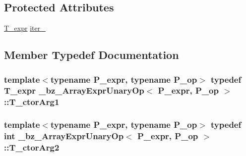 \subsection*{Protected Attributes}
\begin{DoxyCompactItemize}
\item 
\hyperlink{class__bz__ArrayExprUnaryOp_aa7e8d93e795781e0f9bed0120b380365}{T\+\_\+expr} \hyperlink{class__bz__ArrayExprUnaryOp_aed2267d7026324bc825edab2463adb1b}{iter\+\_\+}
\end{DoxyCompactItemize}


\subsection{Member Typedef Documentation}
\hypertarget{class__bz__ArrayExprUnaryOp_a799ed0cf587665fe7429bdd30bd11ca9}{}
\subsubsection[{T\+\_\+ctor\+Arg1}]{\setlength{\rightskip}{0pt plus 5cm}template$<$typename P\+\_\+expr, typename P\+\_\+op$>$ typedef {\bf T\+\_\+expr} {\bf \+\_\+bz\+\_\+\+Array\+Expr\+Unary\+Op}$<$ P\+\_\+expr, P\+\_\+op $>$\+::{\bf T\+\_\+ctor\+Arg1}}\label{class__bz__ArrayExprUnaryOp_a799ed0cf587665fe7429bdd30bd11ca9}
\hypertarget{class__bz__ArrayExprUnaryOp_a9b357117af9cabcc992e7b57e6c3e231}{}
\subsubsection[{T\+\_\+ctor\+Arg2}]{\setlength{\rightskip}{0pt plus 5cm}template$<$typename P\+\_\+expr, typename P\+\_\+op$>$ typedef int {\bf \+\_\+bz\+\_\+\+Array\+Expr\+Unary\+Op}$<$ P\+\_\+expr, P\+\_\+op $>$\+::{\bf T\+\_\+ctor\+Arg2}}\label{class__bz__ArrayExprUnaryOp_a9b357117af9cabcc992e7b57e6c3e231}
\hypertarget{class__bz__ArrayExprUnaryOp_aa7e8d93e795781e0f9bed0120b380365}{}
